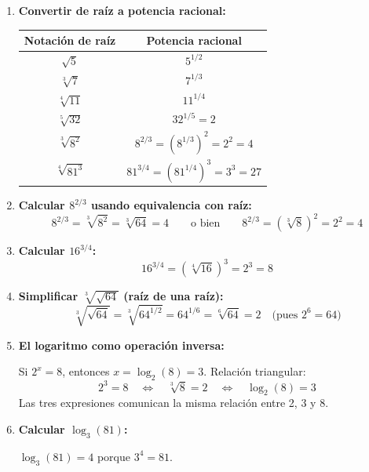 \documentclass[11pt, letterpaper]{article}
\begin{document}
\begin{tcolorbox}[examplebox, title={Ejemplo guiado}]
\begin{enumerate}[label=\textbf{Ej. \arabic*.}, leftmargin=*]

\item \textbf{Convertir de raíz a potencia racional:}

\begin{center}
\renewcommand{\arraystretch}{1.5}
\begin{tabular}{c|c}
\toprule
\textbf{Notación de raíz} & \textbf{Potencia racional}\\
\midrule
$\sqrt{5}$ & $5^{1/2}$\\
$\sqrt[3]{7}$ & $7^{1/3}$\\
$\sqrt[4]{11}$ & $11^{1/4}$\\
$\sqrt[5]{32}$ & $32^{1/5} = 2$\\
$\sqrt[3]{8^2}$ & $8^{2/3} = (8^{1/3})^2 = 2^2 = 4$\\
$\sqrt[4]{81^3}$ & $81^{3/4} = (81^{1/4})^3 = 3^3 = 27$\\
\bottomrule
\end{tabular}
\end{center}

\item \textbf{Calcular $8^{2/3}$ usando equivalencia con raíz:}
$$8^{2/3} = \sqrt[3]{8^2} = \sqrt[3]{64} = 4 \qquad \text{o bien} \qquad 8^{2/3} = (\sqrt[3]{8})^2 = 2^2 = 4$$

\item \textbf{Calcular $16^{3/4}$:}
$$16^{3/4} = (\sqrt[4]{16})^3 = 2^3 = 8$$

\item \textbf{Simplificar $\sqrt[3]{\sqrt{64}}$ (raíz de una raíz):}
$$\sqrt[3]{\sqrt{64}} = \sqrt[3]{64^{1/2}} = 64^{1/6} = \sqrt[6]{64} = 2 \quad \text{(pues }2^6=64\text{)}$$

\item \textbf{El logaritmo como operación inversa:}

Si $2^x = 8$, entonces $x = \log_2(8) = 3$. Relación triangular:
$$2^3 = 8 \quad \Longleftrightarrow \quad \sqrt[3]{8} = 2 \quad \Longleftrightarrow \quad \log_2(8) = 3$$
Las tres expresiones comunican la misma relación entre 2, 3 y 8.

\item \textbf{Calcular $\log_3(81)$:}

$\log_3(81) = 4$ porque $3^4 = 81$.

\end{enumerate}
\end{tcolorbox}
\end{document}

